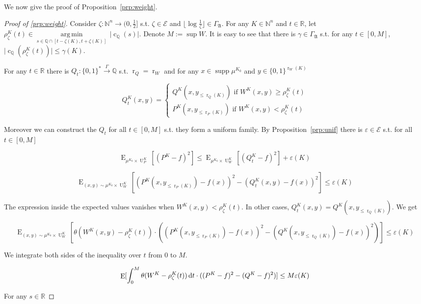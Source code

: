 \documentclass{article}
\numberwithin{equation}{section}
\theoremstyle{definition}
\theoremstyle{plain}
\newcommand{\Bool}{\{0,1\}}
\newcommand{\Words}{{\Bool^*}}
\newcommand{\WordsLen}[1]{{\Bool^{#1}}}
\DeclareMathOperator{\Supp}{supp}
\DeclareMathOperator{\E}{E}
\DeclareMathOperator{\R}{r}
\DeclareMathOperator{\Un}{U}
\DeclareMathOperator{\En}{c}
\newcommand{\Argmin}[1]{\underset{#1}{\operatorname{arg\,min}}\,}
\newcommand{\Nats}{\mathbb{N}}
\newcommand{\Rats}{\mathbb{Q}}
\newcommand{\Reals}{\mathbb{R}}
\newcommand{\Abs}[1]{\lvert #1 \rvert}
\newcommand{\Floor}[1]{\lfloor #1 \rfloor}
\newcommand{\GrowA}{\Gamma_{\mathfrak{A}}}
\newcommand{\Fall}{\mathcal{E}}
\newcommand{\Scheme}{\xrightarrow{\Gamma}}
\begin{document}
We now give the proof of Proposition~\ref{prp:weight}.

\begin{proof}[Proof of \ref{prp:weight}]

Consider $\zeta: \Nats^n \rightarrow (0,\frac{1}{2}]$ s.t.  $\zeta \in \Fall$ and $\Floor{\log \frac{1}{\zeta}} \in \GrowA$. For any $K \in \Nats^n$ and $t \in \Reals$, let $\rho_\zeta^{K}(t) \in \Argmin{s \in \Rats \cap [t-\zeta(K),t+\zeta(K)]} \Abs{\En_\Rats(s)}$. Denote $M:= \sup W$. It is easy to see that there is $\gamma \in \GrowA$ s.t. for any $t \in [0, M]$, ${\Abs{\En_\Rats(\rho_\zeta^{K}(t))} \leq \gamma(K)}$.

For any $t \in \Reals$ there is $Q_t: \Words \Scheme \Rats$ s.t. $\R_Q=\R_W$ and for any $x \in \Supp \mu^{K_0}$ and ${y \in \WordsLen{\R_W(K)}}$

$$Q_t^{K}(x,y)=\begin{cases}Q^{K}(x,y_{\leq \R_Q(K)}) \text{ if } W^{K}(x,y) \geq \rho^{K}_\zeta(t) \\ P^{K}(x,y_{\leq \R_P(K)}) \text{ if } W^{K}(x,y) < \rho^{K}_\zeta(t)\end{cases}$$

Moreover we can construct the $Q_t$ for all $t \in [0, M]$ s.t. they form a uniform family. By Proposition~\ref{prp:unif} there is $\varepsilon \in \Fall$ s.t. for all $t \in [0, M]$

$$\E_{\mu^{K_0} \times \Un_P^{K}}[(P^{K}-f)^2] \leq \E_{\mu^{K_0} \times \Un_W^{K}}[(Q_t^{K}-f)^2] + \varepsilon(K)$$

$$\E_{(x,y) \sim \mu^{K_0} \times \Un_W^{K}}[(P^{K}(x,y_{\leq \R_P(K)})-f(x))^2-(Q_t^{K}(x,y)-f(x))^2] \leq \varepsilon(K)$$

The expression inside the expected values vanishes when $W^{K}(x,y) < \rho^{K}_\zeta(t)$. In other cases, $Q_t^{K}(x,y) = Q^{K}(x,y_{\leq \R_Q(K)})$. We get

$$\E_{(x,y) \sim \mu^{K_0} \times \Un_W^{K}}[\theta(W^{K}(x,y)-\rho_\zeta^{K}(t)) \cdot ((P^{K}(x,y_{\leq \R_P(K)})-f(x))^2-(Q^{K}(x,y_{\leq \R_Q(K)})-f(x))^2)] \leq \varepsilon(K)$$

We integrate both sides of the inequality over $t$ from 0 to $M$.

\begin{equation}
\label{eqn:prp__weight__prf1}
\E[\int_0^M\theta(W^{K}-\rho_\zeta^{K}(t)) \dif t \cdot ((P^{K}-f)^2-(Q^{K}-f)^2)] \leq M \varepsilon(K)
\end{equation}

For any $s \in \Reals$


\end{proof}
\end{document}
